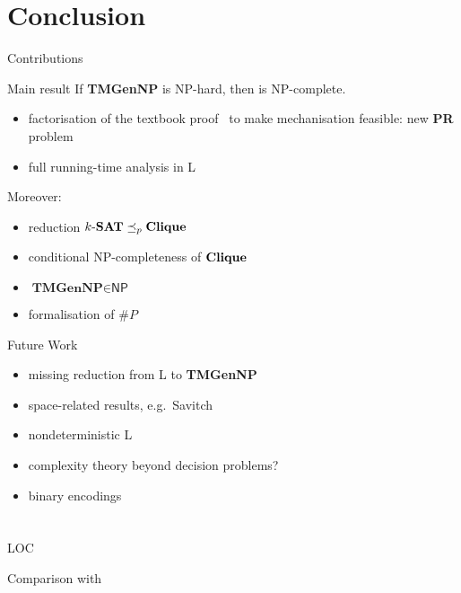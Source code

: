 \documentclass[11pt,usenames,dvipsnames,
hyperref={pdfencoding=auto,psdextra}]{beamer}
\makeatletter
\def\beamer@writeslidentry@miniframesoff{%
  \expandafter\beamer@ifempty\expandafter{\beamer@framestartpage}{}%
  {%
    \clearpage\beamer@notesactions%
  }
}
\newcommand*{\miniframesoff}{\let\beamer@writeslidentry=\beamer@writeslidentry@miniframesoff}
\newcommand*{\PR}{\textbf{PR}}
\newcommand*{\gennp}{\textbf{TMGenNP}}
\newcommand{\NP}{\textsf{NP}}
\makeatother
\begin{document}
\section{Conclusion}
\newcommand{\redP}{\ensuremath{\preceq_p}}
\newcommand{\Clique}{\normalfont\textbf{Clique}}
\begin{frame}{Contributions}
  \begin{block}{Main result}
    If \gennp{} is \NP{}-hard, then \SAT{} is \NP{}-complete. 
  \end{block}
  \begin{itemize}
    \item factorisation of the textbook proof~\cite{Sipser:TheoryofComputation} to make mechanisation feasible: new \PR{} problem
    \item full running-time analysis in L
  \end{itemize}

  Moreover: 
  \begin{itemize}
    \item reduction $\text{$k$-\SAT{}} \redP{} \Clique{}$
    \item conditional \NP{}-completeness of $\Clique{}$
    \item $\gennp{} \in \NP{}$
    \item formalisation of $\#P$
  \end{itemize}
\end{frame}

\begin{frame}{Future Work}
  \begin{itemize}
    \item missing reduction from L to \gennp{} 
    \item space-related results, e.g.\ Savitch
    \item nondeterministic L
    \item complexity theory beyond decision problems?
    \item binary encodings
  \end{itemize}
\end{frame}

\miniframesoff
\section{}

\begin{frame}{LOC}
\end{frame}

\begin{frame}{Comparison with~\cite{gamboa:cook}}

\end{frame}
\end{document}

